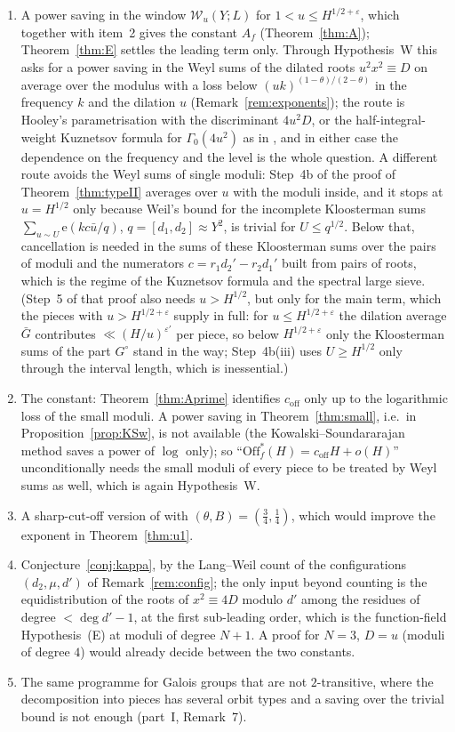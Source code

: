 \documentclass[11pt,a4paper]{article}
\theoremstyle{remark}\newtheorem{remark}[theorem]{Remark}
\newcommand{\Off}{\mathrm{Off}}\newcommand{\e}{\mathrm{e}}
\begin{document}
\begin{enumerate}
\item A power saving in the window $\mathcal W_u(Y;L)$ for $1<u\le H^{1/2+\varepsilon}$, which together with item~2 gives the constant $A_f$ (Theorem~\ref{thm:A});
Theorem~\ref{thm:E} settles the leading term only. Through Hypothesis~W this asks
for a power saving in the Weyl sums of the dilated roots $u^2x^2\equiv D$ on average over the modulus with a loss
below $(uk)^{(1-\theta)/(2-\theta)}$ in the frequency $k$ and the dilation $u$ (Remark~\ref{rem:exponents}); the route
is Hooley's parametrisation with the discriminant $4u^2D$, or the half-integral-weight Kuznetsov formula for
$\Gamma_0(4u^2)$ as in \cite{DFI2012}, and in either case the dependence on the frequency and the level is the whole
question. A different route avoids the Weyl sums of single moduli: Step~4b of the proof of Theorem~\ref{thm:typeII} averages
over $u$ with the moduli inside, and it stops at $u=H^{1/2}$ only because Weil's bound for the incomplete Kloosterman sums
$\sum_{u\sim U}\e(kc\bar u/q)$, $q=[d_1,d_2]\approx Y^2$, is trivial for $U\le q^{1/2}$. Below that, cancellation is needed in the sums of
these Kloosterman sums over the pairs of moduli and the numerators $c=r_1d_2'-r_2d_1'$ built from pairs of roots, which is the
regime of the Kuznetsov formula and the spectral large sieve. (Step~5 of that proof also needs $u>H^{1/2}$, but only for the main term, which the pieces with $u>H^{1/2+\varepsilon}$ supply
in full: for $u\le H^{1/2+\varepsilon}$ the dilation average $\bar G$ contributes $\ll(H/u)^{\varepsilon'}$ per piece, so below $H^{1/2+\varepsilon}$ only the
Kloosterman sums of the part $G^\circ$ stand in the way; Step~4b(iii) uses $U\ge H^{1/2}$ only through the interval length, which is inessential.)
\item The constant: Theorem~\ref{thm:Aprime} identifies $c_{\mathrm{off}}$ only up to the logarithmic loss of the small
moduli. A power saving in Theorem~\ref{thm:small}, i.e.\ in Proposition~\ref{prop:KSw}, is not available (the
Kowalski--Soundararajan method saves a power of $\log$ only); so ``$\Off^\ast_f(H)=c_{\mathrm{off}}H+o(H)$''
unconditionally needs the small moduli of every piece to be treated by Weyl sums as well, which is again
Hypothesis~W.
\item A sharp-cut-off version of \cite{DFI2012} with $(\theta,B)=(\tfrac34,\tfrac14)$, which would improve the
exponent in Theorem~\ref{thm:u1}.
\item Conjecture~\ref{conj:kappa}, by the Lang--Weil count of the configurations $(d_2,\mu,d')$ of
Remark~\ref{rem:config}; the only input beyond counting is the equidistribution of the roots of $x^2\equiv4D$ modulo
$d'$ among the residues of degree $<\deg d'-1$, at the first sub-leading order, which is the function-field
Hypothesis~(E) at moduli of degree $N+1$. A proof for $N=3$, $D=u$ (moduli of degree $4$) would already decide
between the two constants.
\item The same programme for Galois groups that are not $2$-transitive, where the decomposition into pieces has
several orbit types and a saving over the trivial bound is not enough (part~I, Remark~7).
\end{enumerate}
\end{document}
